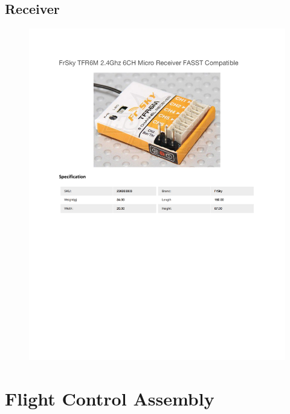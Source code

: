 \documentclass[../main.tex]{subfiles}
\begin{document}
\subsection{Receiver \cite{Receiver}} \label{recevier}
\begin{figure}[H]
	\centering
	\includegraphics[width=\textwidth]{img/specs/receiver.pdf}
\end{figure}

\section{Flight Control Assembly} \label{FlightControl}

\end{document}
